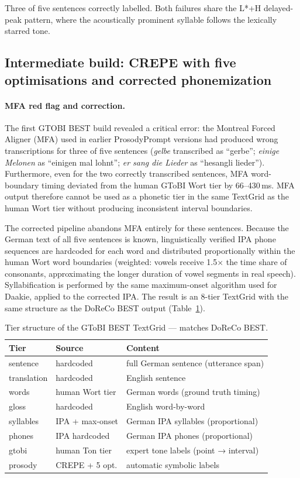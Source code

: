 Three of five sentences correctly labelled. Both failures share the L*+H
delayed-peak pattern, where the acoustically prominent syllable follows the
lexically starred tone.

\subsection{Intermediate build: CREPE with five optimisations and corrected phonemization}

\paragraph{MFA red flag and correction.}
The first GTOBI BEST build revealed a critical error: the Montreal Forced Aligner
(MFA) used in earlier ProsodyPrompt versions had produced wrong transcriptions for
three of five sentences (\textit{gelbe} transcribed as ``gerbe''; \textit{einige
Melonen} as ``einigen mal lohnt''; \textit{er sang die Lieder} as ``hesangli
lieder''). Furthermore, even for the two correctly transcribed sentences, MFA
word-boundary timing deviated from the human GToBI Wort tier by 66--430\,ms.
MFA output therefore cannot be used as a phonetic tier in the same TextGrid as
the human Wort tier without producing inconsistent interval boundaries.

The corrected pipeline abandons MFA entirely for these sentences. Because the
German text of all five sentences is known, linguistically verified IPA phone
sequences are hardcoded for each word and distributed proportionally within the
human Wort word boundaries (weighted: vowels receive 1.5$\times$ the time share
of consonants, approximating the longer duration of vowel segments in real
speech). Syllabification is performed by the same maximum-onset algorithm used
for Daakie, applied to the corrected IPA. The result is an 8-tier TextGrid with
the same structure as the DoReCo BEST output (Table~\ref{tab:gtobi_tiers}).

\begin{table}[h]
\centering
\caption{Tier structure of the GToBI BEST TextGrid — matches DoReCo BEST.}
\label{tab:gtobi_tiers}
\small
\begin{tabular}{lll}
\hline
Tier & Source & Content \\
\hline
sentence    & hardcoded & full German sentence (utterance span) \\
translation & hardcoded & English sentence \\
words       & human Wort tier & German words (ground truth timing) \\
gloss       & hardcoded & English word-by-word \\
syllables   & IPA + max-onset & German IPA syllables (proportional) \\
phones      & IPA hardcoded & German IPA phones (proportional) \\
gtobi       & human Ton tier & expert tone labels (point → interval) \\
prosody     & CREPE + 5 opt. & automatic symbolic labels \\
\hline
\end{tabular}
\end{table}

